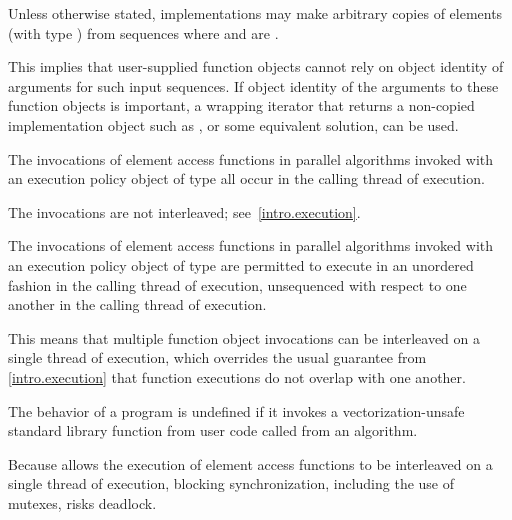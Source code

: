 \pnum
Unless otherwise stated, implementations may make arbitrary copies of elements
(with type ) from sequences
where 
and  are .
\begin{note}
This implies that user-supplied function objects cannot rely on
object identity of arguments for such input sequences.
If object identity of the arguments to these function objects
is important, a wrapping iterator
that returns a non-copied implementation object
such as ,
or some equivalent solution, can be used.
\end{note}

\pnum
The invocations of element access functions in parallel algorithms invoked with
an execution policy object of type  all occur
in the calling thread of execution.
\begin{note}
The invocations are not interleaved; see~\ref{intro.execution}.
\end{note}

\pnum
The invocations of element access functions in parallel algorithms invoked with
an execution policy object of type 
are permitted to execute in an unordered fashion
in the calling thread of execution,
unsequenced with respect to one another in the calling thread of execution.
\begin{note}
This means that multiple function object invocations
can be interleaved on a single thread of execution,
which overrides the usual guarantee from \ref{intro.execution}
that function executions do not overlap with one another.
\end{note}
The behavior of a program is undefined if
it invokes a vectorization-unsafe standard library function
from user code
called from an  algorithm.
\begin{note}
Because  allows
the execution of element access functions
to be interleaved on a single thread of execution,
blocking synchronization, including the use of mutexes, risks deadlock.
\end{note}

